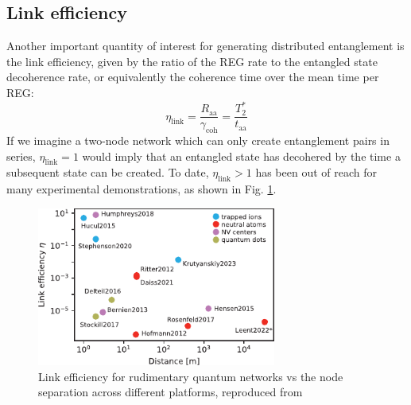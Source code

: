 \subsection{Link efficiency}
Another important quantity of interest for generating distributed entanglement is the link efficiency, given by the ratio of the REG rate to the entangled state decoherence rate, or equivalently the coherence time over the mean time per REG:
\begin{equation}
    \eta_{\text{link}} = \frac{R_{\text{aa}}}{\gamma_{\text{coh}}} = \frac{T_2^*}{t_{\text{aa}}}
\end{equation}
If we imagine a two-node network which can only create entanglement pairs in series, $\eta_{\text{link}}=1$ would imply that an entangled state has decohered by the time a subsequent state can be created. To date, $\eta_{\text{link}}>1$ has been out of reach for many experimental demonstrations, as shown in Fig. \ref{fig:covey_link_eff}.

\begin{figure}[!ht]
    \centering
    \includegraphics[width=0.7\textwidth]{Images/covey_link_efficiency.pdf}
    \caption{Link efficiency for rudimentary quantum  networks vs the node separation across different platforms, reproduced from \cite{Covey2023}}
    \label{fig:covey_link_eff}
\end{figure}

